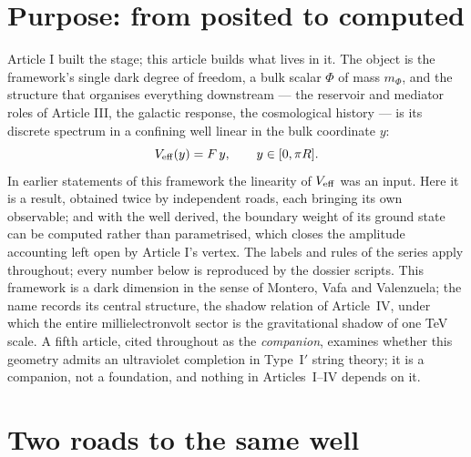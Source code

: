 \begin{abstract}
orders short, so the TeV core and the meV source sector are genuinely independent origins, a structure Article IV will explain rather than repair.
\end{abstract}

\section{Purpose: from posited to computed}
Article I built the stage; this article builds what lives in it. The object is the framework's single dark degree of freedom, a bulk scalar $\Phi$ of mass $m_{\Phi}$, and the structure that organises everything downstream --- the reservoir and mediator roles of Article III, the galactic response, the cosmological history --- is its discrete spectrum in a confining well linear in the bulk coordinate $y$:
\begin{equation}
V_{\rm eff}(y)=F\,y ,\qquad y\in[0,\pi R].
\end{equation}
In earlier statements of this framework the linearity of $V_{\rm eff}$ was an input. Here it is a result, obtained twice by independent roads, each bringing its own observable; and with the well derived, the boundary weight of its ground state can be computed rather than parametrised, which closes the amplitude accounting left open by Article I's vertex. The labels and rules of the series apply throughout; every number below is reproduced by the dossier scripts. This framework is a dark dimension in the sense of Montero, Vafa and Valenzuela; the name records its central structure, the shadow relation of Article~IV, under which the entire millielectronvolt sector is the gravitational shadow of one TeV scale. A fifth article, cited throughout as the \emph{companion}, examines whether this geometry admits an ultraviolet completion in Type~I$'$ string theory; it is a companion, not a foundation, and nothing in Articles~I--IV depends on it.

\section{Two roads to the same well}
